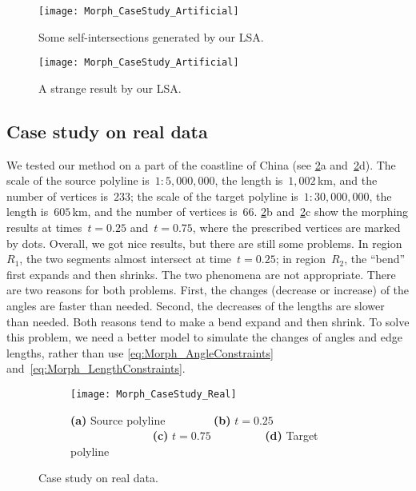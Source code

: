 \begin{figure}[tb]
	\centering	
	\texttt{[image: Morph\_CaseStudy\_Artificial]}
	\caption{Some self-intersections generated by our LSA.}
	\label{fig:Morph_DataComplex}
\par\vspace{\intextsep} %
	\centering	
	\texttt{[image: Morph\_CaseStudy\_Artificial]}
	\caption{A strange result by our LSA.}
	\label{fig:Morph_ExtraVertices}
\end{figure}

\subsection{Case study on real data}
\label{sec:Morph_CaseStudy}

We tested our method on a part of the coastline of China 
(see \figs\ref{fig:Morph_RealData}a 
and~\ref{fig:Morph_RealData}d). 
The scale of the source polyline is~$1:5{,}000{,}000$,
the length is~$1{,}002\,$km, 
and the number of vertices is~$233$; 
the scale of the target polyline is~$1:30{,}000{,}000$, 
the length is~$605\,$km, 
and the number of vertices is~$66$. 
%
\figs\ref{fig:Morph_RealData}b and~\ref{fig:Morph_RealData}c
show the morphing results
at times~$t = 0.25$ and~$t = 0.75$,
where the prescribed vertices are marked by dots. 
Overall, we got nice results, 
but there are still some problems. 
In region~$R_{1}$, the two segments almost 
intersect at time~$t = 0.25$; 
in region~$R_{2}$, 
the ``bend'' first expands and then shrinks. 
The two phenomena are not appropriate. 
There are two reasons for both problems. 
First, the changes (decrease or increase) of the angles 
are faster than needed. 
Second, the decreases of the lengths are slower than needed. 
Both reasons tend to make a bend expand and then shrink. 
To solve this problem, we need a better model to 
simulate the changes of angles and edge lengths,
rather than use \eqs\ref{eq:Morph_AngleConstraints}
and~\ref{eq:Morph_LengthConstraints}.

\begin{figure}[tb]
\begin{subfigure}[b]{\textwidth}
	\centering
	\texttt{[image: Morph\_CaseStudy\_Real]}
	\caption{
		\textbf{(a)} Source polyline~~~~~~~~
		\textbf{(b)} $t=0.25$~~~~~~~~~~~~~~
		\textbf{(c)} $t=0.75$~~~~~~~~~
		\textbf{(d)} Target polyline}
\end{subfigure}
\caption{Case study on real data.}
\label{fig:Morph_RealData}
\end{figure}

